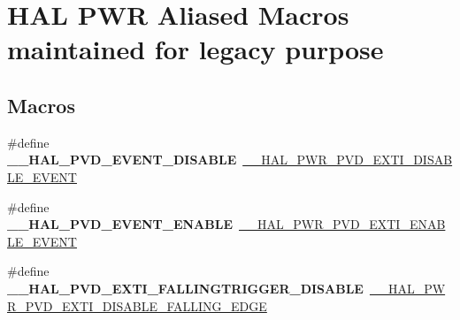 \hypertarget{group___h_a_l___p_w_r___aliased___macros}{}\section{H\+AL P\+WR Aliased Macros maintained for legacy purpose}
\label{group___h_a_l___p_w_r___aliased___macros}
\subsection*{Macros}
\begin{DoxyCompactItemize}
\item 
\mbox{\label{group___h_a_l___p_w_r___aliased___macros_ga753ef2626ac883dbe32f14a481868ed7}} 
\#define {\bfseries \+\_\+\+\_\+\+H\+A\+L\+\_\+\+P\+V\+D\+\_\+\+E\+V\+E\+N\+T\+\_\+\+D\+I\+S\+A\+B\+LE}~\mbox{\hyperlink{group___p_w_r___exported___macro_ga8bd379e960497722450c7cea474a7e7a}{\+\_\+\+\_\+\+H\+A\+L\+\_\+\+P\+W\+R\+\_\+\+P\+V\+D\+\_\+\+E\+X\+T\+I\+\_\+\+D\+I\+S\+A\+B\+L\+E\+\_\+\+E\+V\+E\+NT}}
\item 
\mbox{\label{group___h_a_l___p_w_r___aliased___macros_ga3f1c9ea32a96a6caec349640558a7122}} 
\#define {\bfseries \+\_\+\+\_\+\+H\+A\+L\+\_\+\+P\+V\+D\+\_\+\+E\+V\+E\+N\+T\+\_\+\+E\+N\+A\+B\+LE}~\mbox{\hyperlink{group___p_w_r___exported___macro_gae5ba5672fe8cb7c1686c7f2cc211b128}{\+\_\+\+\_\+\+H\+A\+L\+\_\+\+P\+W\+R\+\_\+\+P\+V\+D\+\_\+\+E\+X\+T\+I\+\_\+\+E\+N\+A\+B\+L\+E\+\_\+\+E\+V\+E\+NT}}
\item 
\mbox{\label{group___h_a_l___p_w_r___aliased___macros_gab68d377995410ab715753e6cc821ac9b}} 
\#define {\bfseries \+\_\+\+\_\+\+H\+A\+L\+\_\+\+P\+V\+D\+\_\+\+E\+X\+T\+I\+\_\+\+F\+A\+L\+L\+I\+N\+G\+T\+R\+I\+G\+G\+E\+R\+\_\+\+D\+I\+S\+A\+B\+LE}~\mbox{\hyperlink{group___p_w_r___exported___macro_ga1ca57168205f8cd8d1014e6eb9465f2d}{\+\_\+\+\_\+\+H\+A\+L\+\_\+\+P\+W\+R\+\_\+\+P\+V\+D\+\_\+\+E\+X\+T\+I\+\_\+\+D\+I\+S\+A\+B\+L\+E\+\_\+\+F\+A\+L\+L\+I\+N\+G\+\_\+\+E\+D\+GE}}
\item 
\mbox{\label{group___h_a_l___p_w_r___aliased___macros_ga9f11243b14ca71ec43c78a894fdc14a2}} 

\end{DoxyCompactItemize}
